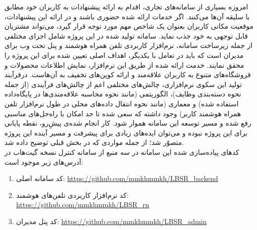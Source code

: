 امروزه بسیاری از سامانه‌های تجاری، اقدام به ارائه پیشنهادات به کاربران خود مطابق با سلیقه آن‌ها می‌کنند. اگر خدمات ارائه شده حضوری باشند و در ارائه این پیشنهادات، موقعیت مکانی کاربران بعنوان یک شاخص مهم مورد توجه قرار گیرد، می‌تواند مشتریان قابل توجهی به خود جذب نماید. سامانه تولید شده در این پروژه شامل اجزای مختلفی از جمله زیرساخت سامانه، نرم‌افزار کاربردی تلفن همراه هوشمند و پنل تحت وب برای مدیران است که باید در تعامل با یکدیگر، اهداف اصلی تعیین شده برای این پروژه را محقق نمایند. خدمت ارائه شده از طریق این نرم‌افزار، نمایش اطلاعات محصولات و فروشگاه‌های متنوع به کاربران علاقه‌مند و ارائه کوپن‌های تخفیف به آن‌هاست. درفرآیند تولید این سکوی نرم‌افزاری، چالش‌های مختلفی اعم از چالش‌های فرآیندی (از جمله نحوه دسته‌بندی وظایف)،‌ الگوریتمی (مانند نحوه محاسبه علاقه‌مندی‌ها در پایگاه‌داده استفاده شده) و معماری (مانند نحوه انتقال داده‌های محلی در طول نرم‌افزار تلفن همراه هوشمند کاربر) وجود داشته که سعی شده تا حد امکان با راه‌حل‌های مناسبی رفع شده و مسیر توسعه این سامانه هموار شود. کار انجام شده‌ی پیشِ‌رو، نقطه پایانی برای این پروژه نبوده و می‌توان ایده‌های زیادی برای پیشرفت و مسیر آینده این پروژه متصوّر شد؛ از جمله مواردی که در بخش قبلی توضیح داده شد.\\

کدهای پیاده‌سازی شده این سامانه در سه منبع از سامانه کنترل نسخه گیت‌هاب در آدرس‌های زیر موجود است:

\begin{enumerate}
	\item کد سامانه اصلی: \url{https://github.com/mmkhmmkh/LBSR_backend}
	\item کد نرم‌افزار کاربردی تلفن‌های هوشمند: \url{https://github.com/mmkhmmkh/LBSR_rn}
	\item کد پنل مدیران: \url{https://github.com/mmkhmmkh/LBSR_admin}
\end{enumerate}

